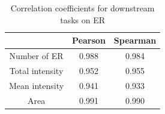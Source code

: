 \begin{table}[htb]
    \centering
    \caption{Correlation coefficients for downstream tasks on ER}
        \begin{adjustbox}{width=0.4\textwidth}
            \begin{tabular}{|c|c|c|}\hline
                &Pearson&Spearman
                \\\hline\hline
                Number of ER & 0.988 & 0.984\\\hline
                Total intensity&0.952&0.955\\\hline
                Mean intensity&0.941&0.933\\\hline
                Area &0.991&0.990\\\hline
            \end{tabular}
        \label{table:er-downstream-metrics-coefficients}
        \end{adjustbox}
\end{table}
